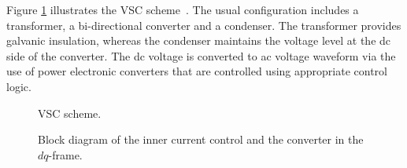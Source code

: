 \documentclass[journal, a4paper]{IEEEtran}
\begin{document}
Figure \ref{vsc} illustrates the VSC 
scheme~\cite{Chauduri:14, belmans:14, chauduri:11}.
The usual configuration includes a transformer, a bi-directional
converter and a condenser.  The transformer provides galvanic
insulation, whereas the condenser maintains the voltage level at the
dc side of the converter.  The dc voltage is converted to ac voltage
waveform via the use of power electronic converters that are controlled 
using appropriate control logic.
\begin{figure}[t!]
  \begin{center}
    \psfrag{+}{\footnotesize{$+$}}
    \psfrag{-}{\footnotesize{$-$}}
    \caption{VSC scheme.}
    \label{vsc}
  \end{center}
  \vspace{-0.2cm}
\end{figure}
\begin{figure}[t!]
  \begin{center}
    \psfrag{+}{\footnotesize{$+$}}
    \psfrag{-}{\footnotesize{$-$}}
    \caption{Block diagram of the inner current control and the converter in the $dq$-frame.}
    \label{vsccoupling}
  \end{center}
  \vspace{-0.4cm}
\end{figure}
\end{document}
